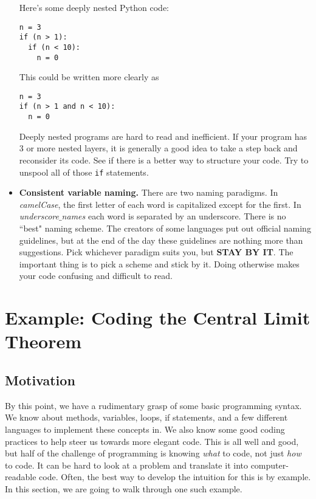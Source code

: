\documentclass[a4paper]{article}
\begin{document}
\begin{itemize}
Here's \ex some deeply nested Python code:
\begin{verbatim}
n = 3
if (n > 1):
  if (n < 10):
    n = 0
\end{verbatim}
This could be written more clearly as
\begin{verbatim}
n = 3
if (n > 1 and n < 10):
  n = 0
\end{verbatim}

Deeply nested programs are hard to read and inefficient. If your program has 3 or more nested layers, it is generally a good idea to take a step back and reconsider its code. See if there is a better way to structure your code. Try to unspool all of those \texttt{if} statements.

\item {\bf Consistent variable naming.} There are two naming paradigms. In \\{\it camelCase}, the first letter of each word is capitalized except for the first. In \\{\it underscore$\_$names} each word is separated by an underscore. There is no ``best" naming scheme. The creators of some languages put out official naming guidelines, but at the end of the day these guidelines are nothing more than suggestions. Pick whichever paradigm suits you, but {\bf STAY BY IT}. The important thing is to pick a scheme and stick by it. Doing otherwise makes your code confusing and difficult to read.
\end{itemize}

\section{Example: Coding the Central Limit Theorem}
\subsection{Motivation}
By this point, we have a rudimentary grasp of some basic programming syntax. We know about methods, variables, loops, if statements, and a few different languages to implement these concepts in. We also know some good coding practices to help steer us towards more elegant code. This is all well and good, but half of the challenge of programming is knowing {\it what} to code, not just {\it how} to code. It can be hard to look at a problem and translate it into computer-readable code. Often, the best way to develop the intuition for this is by example. In this section, we are going to walk through one such example.
\end{document}
